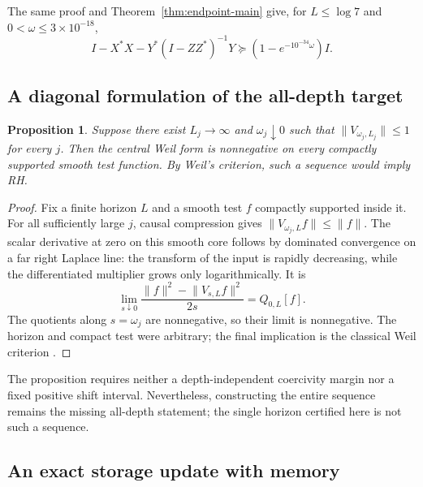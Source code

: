 \documentclass[11pt]{article}
\numberwithin{equation}{section}
\newtheorem{proposition}[theorem]{Proposition}
\theoremstyle{definition}
\theoremstyle{remark}
\newcommand{\norm}[1]{\lVert#1\rVert}
\begin{document}
The same proof and Theorem~\ref{thm:endpoint-main} give, for $L\le\log7$
and $0<\omega\le3\times10^{-18}$,
\[
 I-X^*X-Y^*(I-ZZ^*)^{-1}Y\succeq(1-e^{-10^{-34}\omega})I.
\]

\subsection{A diagonal formulation of the all-depth target}

\begin{proposition}\label{prop:diagonal}
Suppose there exist $L_j\to\infty$ and $\omega_j\downarrow0$ such that
$\norm{V_{\omega_j,L_j}}\le1$ for every $j$. Then the central Weil form
is nonnegative on every compactly supported smooth test function.
By Weil's criterion, such a sequence would imply RH.
\end{proposition}
\begin{proof}
Fix a finite horizon $L$ and a smooth test $f$ compactly supported inside it.
For all sufficiently large $j$, causal compression gives
$\norm{V_{\omega_j,L}f}\le\norm f$.
The scalar derivative at zero on this smooth core follows by dominated
convergence on a far right Laplace line: the transform of the input is
rapidly decreasing, while the differentiated multiplier grows only
logarithmically. It is
\[
 \lim_{s\downarrow0}\frac{\norm f^2-\norm{V_{s,L}f}^2}{2s}
 =Q_{0,L}[f].
\]
The quotients along $s=\omega_j$ are nonnegative, so their limit is
nonnegative. The horizon and compact test were arbitrary; the final
implication is the classical Weil criterion
\cite{ConnesConsani2020,Conrey2019}.
\end{proof}

The proposition requires neither a depth-independent coercivity margin nor
a fixed positive shift interval. Nevertheless, constructing the entire
sequence remains the missing all-depth statement; the single horizon
certified here is not such a sequence.

\subsection{An exact storage update with memory}\label{sec:recursion}
\end{document}
